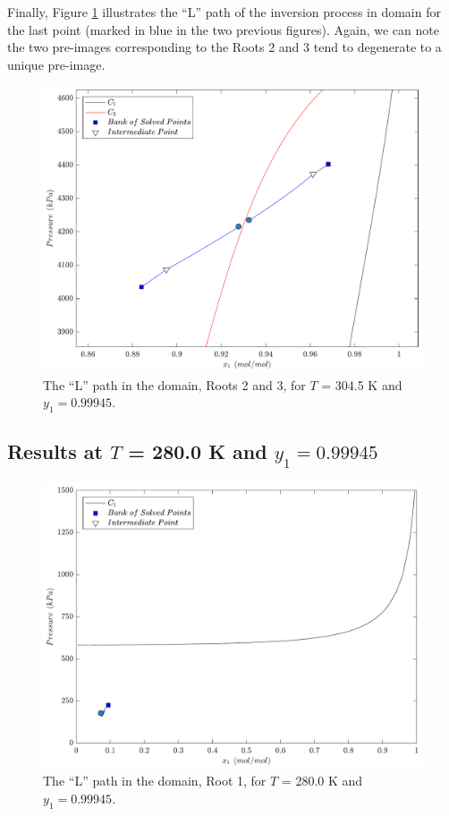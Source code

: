 \documentclass[journal=iecred,manuscript=article]{achemso}
\theoremstyle{definition}
\theoremstyle{remark}
\begin{document}
Finally, Figure \ref{fig:L_S} illustrates the \enquote{L} path of the inversion process in domain for the last point (marked in blue in the two previous figures). Again, we can note the two pre-images corresponding to the Roots 2 and 3 tend to degenerate to a unique pre-image.

\begin{figure}
	\begin{center}
		\includegraphics[scale=0.50]{caminhos_L_degeneracao_dominio2.pdf}
		\caption{The \enquote{L} path in the domain, Roots 2 and 3, for $T$ = 304.5 K and $y_1 = 0.99945$.}\label{fig:L_S}
	\end{center}
\end{figure}

\subsection{Results at $T$ = 280.0 K and $y_1 = 0.99945$}

\begin{figure}
	\begin{center}
		\includegraphics[scale=0.50]{caminhos_L_degeneracao_dominio3.pdf}
		\caption{The \enquote{L} path in the domain, Root 1, for $T$ = 280.0 K and $y_1 = 0.99945$.}\label{fig:L_S2}
	\end{center}
\end{figure}
\end{document}
